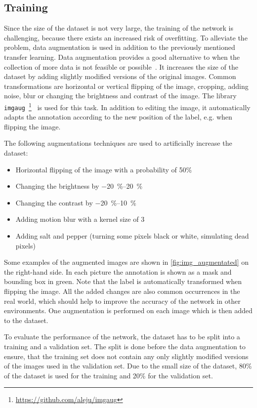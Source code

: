 \subsection{Training}
\label{ssec:training}
Since the size of the dataset is not very large, the training of the network is challenging, because there exists an increased risk of overfitting.
To alleviate the problem, data augmentation is used in addition to the previously mentioned transfer learning.
Data augmentation provides a good alternative to when the collection of more data is not feasible or possible~\cite{Shorten2019}.
It increases the size of the dataset by adding slightly modified versions of the original images.
Common transformations are horizontal or vertical flipping of the image, cropping, adding noise, blur or changing the brightness and contrast of the image.
The library \texttt{imgaug}~\footnote{\url{https://github.com/aleju/imgaug}}~\cite{Jung2018} is used for this task.
In addition to editing the image, it automatically adapts the annotation according to the new position of the label, e.g. when flipping the image.

The following augmentations techniques are used to artificially increase the dataset:
\begin{itemize}
    \item Horizontal flipping of the image with a probability of 50\%
    \item Changing the brightness by \SIrange{-20}{20}{\percent}
    \item Changing the contrast by \SIrange{-20}{10}{\percent}
    \item Adding motion blur with a kernel size of 3
    \item Adding salt and pepper (turning some pixels black or white, simulating dead pixels)
\end{itemize}

Some examples of the augmented images are shown in \cref{fig:img_augmentated} on the right-hand side.
In each picture the annotation is shown as a mask and bounding box in green.
Note that the label is automatically transformed when flipping the image.
All the added changes are also common occurrences in the real world, which should help to improve the accuracy of the network in other environments.
One augmentation is performed on each image which is then added to the dataset.

To evaluate the performance of the network, the dataset has to be split into a training and a validation set.
The split is done before the data augmentation to ensure, that the training set does not contain any only slightly modified versions of the images used in the validation set.
Due to the small size of the dataset, 80\% of the dataset is used for the training and 20\% for the validation set.

